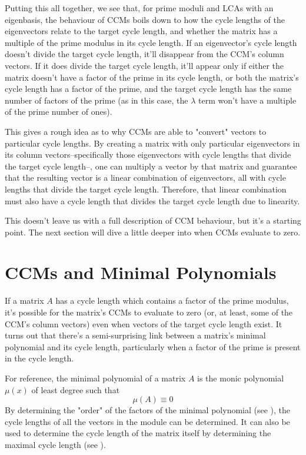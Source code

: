 \documentclass[a4paper, 12pt, reqno]{amsart}
\begin{document}
	Putting this all together, we see that, for prime moduli and LCAs with an eigenbasis, the behaviour of CCMs boils down to how the cycle lengths of the eigenvectors
	relate to the target cycle length, and whether the matrix has a multiple of the prime modulus in its cycle length. If an eigenvector's cycle length doesn't divide the
	target cycle length, it'll disappear from the CCM's column vectors. If it does divide the target cycle length, it'll appear only if either the matrix doesn't have
	a factor of the prime in its cycle length, or both the matrix's cycle length has a factor of the prime, and the target cycle length has the same number of factors of
	the prime (as in this case, the $\lambda$ term won't have a multiple of the prime number of ones).
	
	This gives a rough idea as to why CCMs are able to "convert" vectors to particular cycle lengths. By creating a matrix with only particular eigenvectors in its column
	vectors--specifically those eigenvectors with cycle lengths that divide the target cycle length--, one can multiply a vector by that matrix and guarantee that the 
	resulting vector is a linear combination of eigenvectors, all with cycle lengths that divide the target cycle length. Therefore, that linear combination must also have
	a cycle length that divides the target cycle length due to linearity.
	
	This doesn't leave us with a full description of CCM behaviour, but it's a starting point. The next section will dive a little deeper into when CCMs evaluate to zero.
	
	\section{CCMs and Minimal Polynomials}
	If a matrix $A$ has a cycle length which contains a factor of the prime modulus, it's possible for the matrix's CCMs to evaluate to zero (or, at least, some of the CCM's
	column vectors) even when vectors of the target cycle length exist. It turns out that there's a semi-surprising link between a matrix's minimal polynomial and its cycle
	length, particularly when a factor of the prime is present in the cycle length.
	
	For reference, the minimal polynomial of a matrix $A$ is the monic polynomial $\mu(x)$ of least degree such that
	\[
		\mu(A) \equiv 0
	\]
	By determining the "order" of the factors of the minimal polynomial (see \citet{Patterson2008}), the cycle lengths of all the vectors in the module can be determined.
	It can also be used to determine the cycle length of the matrix itself by determining the maximal cycle length (see \citet{Mendivil2012}). 
	
\end{document}
